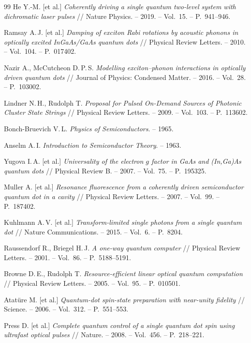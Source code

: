 \documentclass[11pt]{article}    %
\numberwithin{equation}{section}
\begin{document}
\begin{thebibliography}{99}
He Y.-M. [et al.] \textit{Coherently driving a single quantum two-level system with dichromatic laser pulses} // Nature Physics. -- 2019. -- Vol.~15. -- P.~941--946.

Ramsay A.\,J. [et al.] \textit{Damping of exciton Rabi rotations by acoustic phonons in optically excited InGaAs/GaAs quantum dots} // Physical Review Letters. -- 2010. -- Vol.~104. -- P.~017402.

Nazir A., McCutcheon D.\,P.\,S. \textit{Modelling exciton--phonon interactions in optically driven quantum dots} // Journal of Physics: Condensed Matter. -- 2016. -- Vol.~28. -- P.~103002.

Lindner N.\,H., Rudolph T. \textit{Proposal for Pulsed On-Demand Sources of Photonic Cluster State Strings} // Physical Review Letters. -- 2009. -- Vol.~103. -- P.~113602.

Bonch-Bruevich V.\,L. \textit{Physics of Semiconductors}. -- 1965.

Anselm A.\,I. \textit{Introduction to Semiconductor Theory}. -- 1963.

Yugova I.\,A. [et al.] \textit{Universality of the electron $g$ factor in GaAs and (In,Ga)As quantum dots} // Physical Review B. -- 2007. -- Vol.~75. -- P.~195325.

Muller A. [et al.] \textit{Resonance fluorescence from a coherently driven semiconductor quantum dot in a cavity} // Physical Review Letters. -- 2007. -- Vol.~99. -- P.~187402.

Kuhlmann A.\,V. [et al.] \textit{Transform-limited single photons from a single quantum dot} // Nature Communications. -- 2015. -- Vol.~6. -- P.~8204.

Raussendorf R., Briegel H.\,J. \textit{A one-way quantum computer} // Physical Review Letters. -- 2001. -- Vol.~86. -- P.~5188--5191.

Browne D.\,E., Rudolph T. \textit{Resource-efficient linear optical quantum computation} // Physical Review Letters. -- 2005. -- Vol.~95. -- P.~010501.

Atat\"ure M. [et al.] \textit{Quantum-dot spin-state preparation with near-unity fidelity} // Science. -- 2006. -- Vol.~312. -- P.~551--553.

Press D. [et al.] \textit{Complete quantum control of a single quantum dot spin using ultrafast optical pulses} // Nature. -- 2008. -- Vol.~456. -- P.~218--221.


\end{thebibliography}
\end{document}
